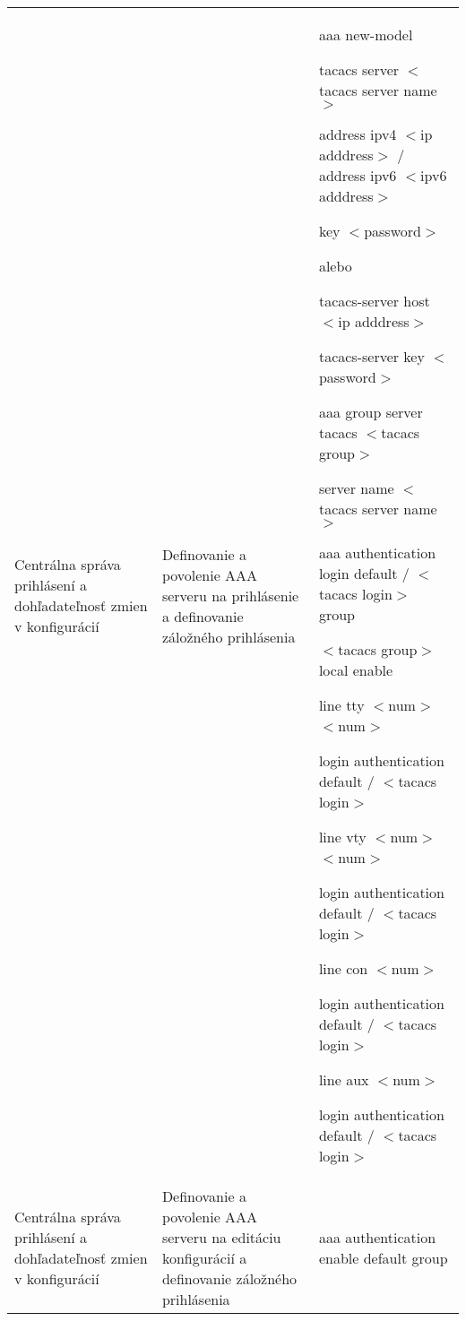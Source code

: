\begin{longtable}[!htbp]{|L{10em}L{10em}>{\selectfont}L{34em}|}
	
	
	
	 Centrálna správa prihlásení a dohľadateľnosť zmien v konfigurácií	&Definovanie a povolenie AAA serveru na prihlásenie a definovanie záložného prihlásenia	&aaa new-model
	
	tacacs server $<$tacacs server name$>$
	
	\hspace{0.5em}address ipv4 $<$ip adddress$>$ / address ipv6 $<$ipv6 adddress$>$
	
	\hspace{0.5em}key $<$password$>$
	\vspace{0.5em}
	
	{\selectfont alebo}
	
	\vspace{0.5em}
	tacacs-server host $<$ip adddress$>$
	
	tacacs-server key $<$password$>$
	
	\vspace{0.5em}
	
	aaa group server tacacs $<$tacacs group$>$
	
	\hspace{0.5em}server name $<$tacacs server name$>$
	
	aaa authentication login default / $<$tacacs login$>$ group 
	
	\hspace{0.5em}$<$tacacs group$>$ local enable
	
	line tty $<$num$>$ $<$num$>$
	
	\hspace{0.5em}login authentication default / $<$tacacs login$>$
	
	line vty $<$num$>$ $<$num$>$
	
	\hspace{0.5em}login authentication default / $<$tacacs login$>$
	
	line con $<$num$>$
	
	\hspace{0.5em}login authentication default / $<$tacacs login$>$
	
	line aux $<$num$>$
	
	
	\hspace{0.5em}login authentication default / $<$tacacs login$>$\\
	
	
	
	
	Centrálna správa prihlásení a dohľadateľnosť zmien v konfigurácií	&Definovanie a povolenie AAA serveru na editáciu konfigurácií a definovanie záložného prihlásenia	&aaa authentication enable default group 
	

\end{longtable}
